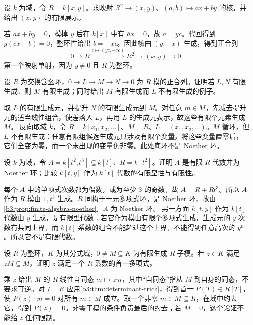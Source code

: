 \begin{exercise}\label{b3:ex:03-two-variable-relation}
	设 \(k\) 为域，令 \(R=k[x,y]\)。求映射 \(R^2\rightarrow(x,y)\)、\((a,b)\mapsto ax+by\) 的核，并给出 \((x,y)\) 的有限展示。
\end{exercise}
\begin{solution}
	若 \(ax+by=0\)，模掉 \(y\) 后在 \(k[x]\) 中有 \(\bar a x=0\)，故 \(a=yc\)。代回得到 \(y(cx+b)=0\)，整环性给出 \(b=-xc\)。因此核由 \((y,-x)\) 生成，得到正合列
	\[
		0\longrightarrow R\xrightarrow{c\mapsto(yc,-xc)}R^2 \longrightarrow(x,y)\longrightarrow0.
	\]
	第一个映射单射，因为 \(y\ne0\) 且 \(R\) 为整环。
\end{solution}

\begin{exercise}\label{b3:ex:03-finite-extension-modules}
	设 \(R\) 为交换含幺环，\(0\rightarrow L\rightarrow M\rightarrow N\rightarrow0\) 为 \(R\) 模的正合列。证明若 \(L,N\) 有限生成，则 \(M\) 有限生成；同时给出 \(M\) 有限生成而 \(L\) 不有限生成的例子。
\end{exercise}
\begin{solution}
	取 \(L\) 的有限生成元，并提升 \(N\) 的有限生成元到 \(M\)。对任意 \(m\in M\)，先减去提升元的适当线性组合，使差落入 \(L\)，再用 \(L\) 的生成元表示，故这些有限个元素生成 \(M\)。 反向取域 \(k\)，令 \(R=k[x_1,x_2,\ldots]\)、\(M=R\)、\(L=(x_1,x_2,\ldots)\)。\(M\) 循环，但 \(L\) 不有限生成：任意有限组候选生成元只涉及有限个变量，将这些变量置零后，它们全变为零，而一个未出现的变量仍非零。此处底环不是 Noether 环。
\end{solution}

\begin{exercise}\label{b3:ex:03-cusp-finite}
	设 \(k\) 为域，令 \(A=k[t^2,t^3]\subseteq k[t]\)、\(R=k[t^2]\)。证明 \(A\) 是有限 \(R\) 代数并为 Noether 环；比较 \(k[t,y]\) 作为 \(k[t]\) 代数的有限型性与有限性。
\end{exercise}
\begin{solution}
	每个 \(A\) 中的单项式次数都为偶数，或为至少 \(3\) 的奇数，故 \(A=R+Rt^3\)。所以 \(A\) 作为 \(R\) 模由 \(1,t^3\) 生成。\(R\) 同构于一元多项式环，是 Noether 环，故由\cref{b3:prop:finite-algebra-noether}，\(A\) 为 Noether 环。 另一方面 \(k[t,y]\) 作为 \(k[t]\) 代数由 \(y\) 生成，是有限型代数；若它作为模由有限个多项式生成，生成元的 \(y\) 次数有共同上界，而 \(k[t]\) 系数的组合不能超过这个上界，不能得到任意高次的 \(y^n\)。所以它不是有限代数。
\end{solution}

\begin{exercise}\label{b3:ex:03-determinant-integrality}
	设 \(R\) 为整环，\(K\) 为其分式域，\(0\ne M\subseteq K\) 为有限生成 \(R\) 子模。若 \(z\in K\) 满足 \(zM\subseteq M\)，证明 \(z\) 满足一个 \(R\) 系数的首一多项式。
\end{exercise}
\begin{solution}
	乘 \(z\) 给出 \(M\) 的 \(R\) 线性自同态 \(m\mapsto zm\)，其中“自同态”指从 \(M\) 到自身的同态，不要求可逆。对 \(I=R\) 应用\cref{b3:thm:determinant-trick}，得到首一 \(P(T)\in R[T]\)，使 \(P(z)\cdot m=0\) 对所有 \(m\in M\) 成立。取一个非零 \(m\in M\subseteq K\)，在域中约去它，得到 \(P(z)=0\)。非零子模的条件负责最后的约去；若 \(M=0\)，这个论证不能给 \(z\) 任何限制。
\end{solution}

